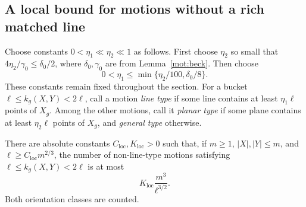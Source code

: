 \subsection{A local bound for motions without a rich matched line}

Choose constants \(0<\eta_1\ll\eta_2\ll1\) as follows.
First choose \(\eta_2\) so small that
\(4\eta_2/\gamma_0\le\delta_0/2\), where
\(\delta_0,\gamma_0\) are from Lemma~\ref{mot:beck}.
Then choose
\[
 0<\eta_1\le\min\{\eta_2/100,\delta_0/8\}.
\]
These constants remain fixed throughout the section.
For a bucket \(\ell\le k_g(X,Y)<2\ell\), call a motion
\emph{line type} if some line contains at least \(\eta_1\ell\)
points of \(X_g\).  Among the other motions, call it
\emph{planar type} if some plane contains at least
\(\eta_2\ell\) points of \(X_g\), and \emph{general type}
otherwise.

\begin{lemma}
\label{mot:local}
There are absolute constants \(C_{\mathrm{loc}},K_{\mathrm{loc}}>0\)
such that, if \(m\ge1\), \(|X|,|Y|\le m\), and
\(\ell\ge C_{\mathrm{loc}}m^{2/3}\), the number of non-line-type
motions satisfying \(\ell\le k_g(X,Y)<2\ell\) is at most
\[
 K_{\mathrm{loc}}\frac{m^3}{\ell^{3/2}}.
\]
Both orientation classes are counted.
\end{lemma}

